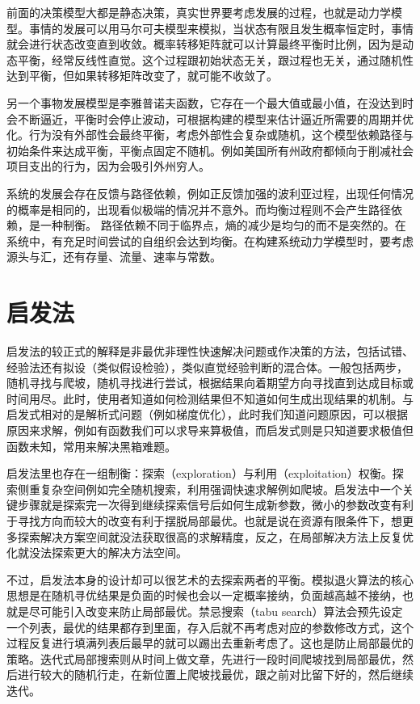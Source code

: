 \documentclass[]{tufte-book}
\begin{document}
前面的决策模型大都是静态决策，真实世界要考虑发展的过程，也就是动力学模型。事情的发展可以用马尔可夫模型来模拟，当状态有限且发生概率恒定时，事情就会进行状态改变直到收敛。概率转移矩阵就可以计算最终平衡时比例，因为是动态平衡，经常反线性直觉。这个过程跟初始状态无关，跟过程也无关，通过随机性达到平衡，但如果转移矩阵改变了，就可能不收敛了。

另一个事物发展模型是李雅普诺夫函数，它存在一个最大值或最小值，在没达到时会不断逼近，平衡时会停止波动，可根据构建的模型来估计逼近所需要的周期并优化。行为没有外部性会最终平衡，考虑外部性会复杂或随机，这个模型依赖路径与初始条件来达成平衡，平衡点固定不随机。例如美国所有州政府都倾向于削减社会项目支出的行为，因为会吸引外州穷人。

系统的发展会存在反馈与路径依赖，例如正反馈加强的波利亚过程，出现任何情况的概率是相同的，出现看似极端的情况并不意外。而均衡过程则不会产生路径依赖，是一种制衡。 路径依赖不同于临界点，熵的减少是均匀的而不是突然的。在系统中，有充足时间尝试的自组织会达到均衡。在构建系统动力学模型时，要考虑源头与汇，还有存量、流量、速率与常数。

\hypertarget{ux542fux53d1ux6cd5}{%
\section{启发法}\label{ux542fux53d1ux6cd5}}

启发法的较正式的解释是非最优非理性快速解决问题或作决策的方法，包括试错、经验法还有拟设（类似假设检验），类似直觉经验判断的混合体。一般包括两步，随机寻找与爬坡，随机寻找进行尝试，根据结果向着期望方向寻找直到达成目标或时间用尽。此时，使用者知道如何检测结果但不知道如何生成出现结果的机制。与启发式相对的是解析式问题（例如梯度优化），此时我们知道问题原因，可以根据原因来求解，例如有函数我们可以求导来算极值，而启发式则是只知道要求极值但函数未知，常用来解决黑箱难题。

启发法里也存在一组制衡：探索（exploration）与利用（exploitation）权衡。探索侧重复杂空间例如完全随机搜索，利用强调快速求解例如爬坡。启发法中一个关键步骤就是探索完一次得到继续探索信号后如何生成新参数，微小的参数改变有利于寻找方向而较大的改变有利于摆脱局部最优。也就是说在资源有限条件下，想更多探索解决方案空间就没法获取很高的求解精度，反之，在局部解决方法上反复优化就没法探索更大的解决方法空间。

不过，启发法本身的设计却可以很艺术的去探索两者的平衡。模拟退火算法的核心思想是在随机寻优结果是负面的时候也会以一定概率接纳，负面越高越不接纳，也就是尽可能引入改变来防止局部最优。禁忌搜索（tabu search）算法会预先设定一个列表，最优的结果都存到里面，存入后就不再考虑对应的参数修改方式，这个过程反复进行填满列表后最早的就可以踢出去重新考虑了。这也是防止局部最优的策略。迭代式局部搜索则从时间上做文章，先进行一段时间爬坡找到局部最优，然后进行较大的随机行走，在新位置上爬坡找最优，跟之前对比留下好的，然后继续迭代。
\end{document}

